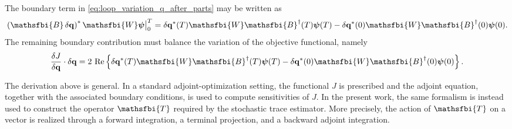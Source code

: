 \begin{appendices}
The boundary term in \eqref{eq:loop_variation_q_after_parts} may be written as
\begin{equation}
  \left.
    \left(
      \mathsfbi{B}\,\delta\mathbf{q}
    \right)^{*}
    \mathsfbi{W}\boldsymbol{\psi}
  \right|_{0}^{T}
  =
  \delta\mathbf{q}^{*}(T)
  \mathsfbi{W}
  \mathsfbi{B}^{\dagger}(T)\boldsymbol{\psi}(T)
  -
  \delta\mathbf{q}^{*}(0)
  \mathsfbi{W}
  \mathsfbi{B}^{\dagger}(0)\boldsymbol{\psi}(0).
  \label{eq:loop_boundary_term}
\end{equation}
The remaining boundary contribution must balance the variation of the objective functional, namely
\begin{equation}
  \frac{\delta J}{\delta \mathbf{q}}\cdot\delta\mathbf{q}
  =
  2\,\operatorname{Re}
  \left\{
  \delta\mathbf{q}^{*}(T)
  \mathsfbi{W}
  \mathsfbi{B}^{\dagger}(T)\boldsymbol{\psi}(T)
  -
  \delta\mathbf{q}^{*}(0)
  \mathsfbi{W}
  \mathsfbi{B}^{\dagger}(0)\boldsymbol{\psi}(0)
  \right\}.
  \label{eq:loop_boundary_balance_general}
\end{equation}

The derivation above is general. In a standard adjoint-optimization setting, the functional \(J\) is prescribed and the adjoint equation, together with the associated boundary conditions, is used to compute sensitivities of \(J\). In the present work, the same formalism is instead used to construct the operator \(\mathsfbi{T}\) required by the stochastic trace estimator. More precisely, the action of \(\mathsfbi{T}\) on a vector is realized through a forward integration, a terminal projection, and a backward adjoint integration.


\end{appendices}
